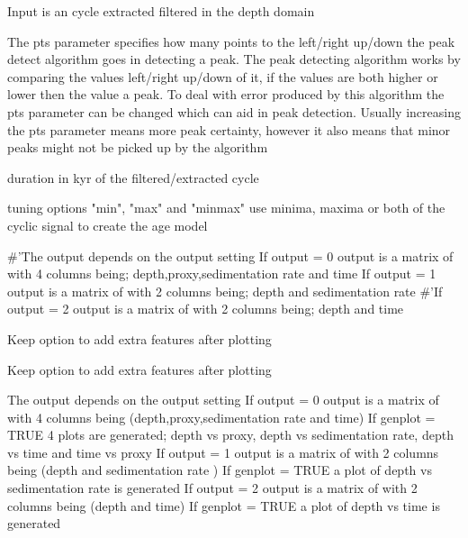 \documentclass[a4paper]{book}
\begin{document}
\begin{Arguments}
\begin{ldescription}
\item[\code{data}] Input is an cycle extracted filtered in the depth domain

\item[\code{pts}] The pts parameter specifies how many points to the left/right up/down the peak detect algorithm goes in detecting
a peak. The peak detecting algorithm works by comparing the values left/right up/down of it, if the values are both higher or lower
then the value a peak. To deal with error produced by this algorithm the pts parameter can be changed which can
aid in peak detection. Usually increasing the pts parameter means more peak certainty, however it also means that minor peaks might not be
picked up by the algorithm 

\item[\code{cycle}] duration in kyr of the filtered/extracted cycle

\item[\code{tune\_opt}] tuning options "min", "max" and "minmax" use minima, maxima or both
of the cyclic signal to create the age model 

\item[\code{output}] \#'The output depends on the output setting
If output = 0 output is a matrix of with 4 columns being; depth,proxy,sedimentation rate and time
If output = 1 output is a matrix of with 2 columns being; depth and sedimentation rate
\#'If output = 2 output is a matrix of with 2 columns being; depth and time

\item[\code{genplot}] Keep option to add extra features after plotting  

\item[\code{keep\_editable}] Keep option to add extra features after plotting  
\end{ldescription}
\end{Arguments}
%
\begin{Value}
The output depends on the output setting
If output = 0 output is a matrix of with 4 columns being (depth,proxy,sedimentation rate and time)
If genplot = TRUE 4 plots are generated; depth vs proxy, depth vs sedimentation rate, depth vs time and time vs proxy
If output = 1 output is a matrix of with 2 columns being (depth and sedimentation rate )
If genplot = TRUE a plot of depth vs sedimentation rate is generated
If output = 2 output is a matrix of with 2 columns being (depth and time)
If genplot = TRUE a plot of depth vs time is generated
\end{Value}
\end{document}
